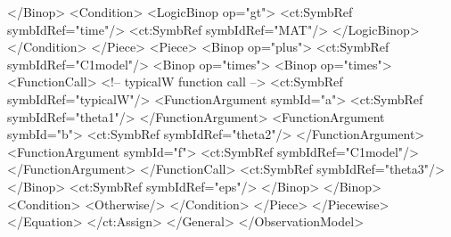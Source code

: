 \documentclass[a4paper,10pt]{article}
\begin{document}
\begin{xmlcode}
                        </Binop>
                        <Condition>
                            <LogicBinop op="gt">
                                <ct:SymbRef symbIdRef="time"/>
                                <ct:SymbRef symbIdRef="MAT"/> 
                            </LogicBinop>
                        </Condition>
                    </Piece>
                    <Piece>
                        <Binop op="plus">
                            <ct:SymbRef symbIdRef="C1model"/>
                            <Binop op="times">
                                <Binop op="times">
                                    <FunctionCall>			<!-- typicalW function call -->
                                        <ct:SymbRef symbIdRef="typicalW"/>
                                        <FunctionArgument symbId="a">
                                            <ct:SymbRef symbIdRef="theta1"/>
                                        </FunctionArgument>
                                        <FunctionArgument symbId="b">
                                            <ct:SymbRef symbIdRef="theta2"/>
                                        </FunctionArgument>
                                        <FunctionArgument symbId="f">
                                            <ct:SymbRef symbIdRef="C1model"/>
                                        </FunctionArgument>
                                    </FunctionCall>
                                    <ct:SymbRef symbIdRef="theta3"/>
                                </Binop>                                            
                                <ct:SymbRef symbIdRef="eps"/>
                            </Binop>
                        </Binop>
                        <Condition>
                            <Otherwise/>
                        </Condition>
                    </Piece>
                </Piecewise>
            </Equation>
        </ct:Assign>
    </General>
</ObservationModel>
\end{xmlcode}
\end{document}
